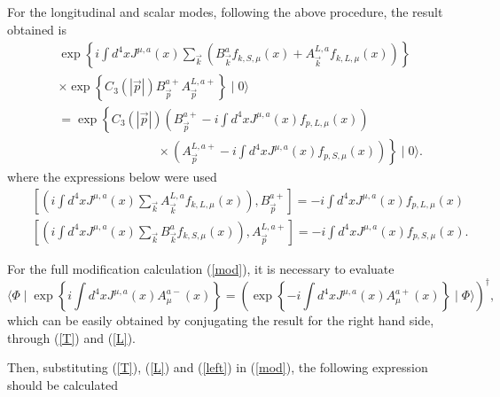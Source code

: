 \documentclass[12pt,letterpaper]{report}
\begin{document}
For the longitudinal and scalar modes, following the above
procedure, the result obtained is
\begin{eqnarray}
&&\exp \left\{i\int d^4xJ^{\mu,a}\left(x\right)
\sum\limits_{\vec{k} }\left(B_{\vec{k}}^af_{k,S,\mu }\left(
x\right) +A_{\vec{k} }^{L,a}f_{k,L,\mu }\left(x\right) \right)
\right\}\nonumber \\ && \times \exp \left\{ C_3\left(\left|
\vec{p}\right| \right) B_{\vec{p}}^{a+}A_{\vec{p}}^{L,a+}\right\}
\mid 0\rangle \nonumber
\\ &&=\exp \left\{ C_3\left(\left| \vec{p}\right| \right) \left(
B_{\vec{p} }^{a+}-i\int d^4xJ^{\mu,a}\left(x\right) f_{p,L,\mu
}\left(x\right) \right) \right. \nonumber
\\&& \qquad\qquad\qquad\qquad \times \left.
\left(A_{\vec{p}}^{L,a+} -i\int d^4xJ^{\mu,a}\left(x\right)
f_{p,S,\mu }\left(x\right) \right) \right\} \mid
0\rangle.\label{L}
\end{eqnarray}
where the expressions below were used
\begin{eqnarray*}
&&\left[ \left(i\int d^4xJ^{\mu,a}\left(x\right)
\sum\limits_{\vec{k} } A_{\vec{k} }^{L,a}f_{k,L,\mu }\left(
x\right) \right),B_{\vec{p}}^{a+}\right] =-i\int
d^4xJ^{\mu,a}\left(x\right) f_{p,L,\mu }\left(x\right) \\ &&\left[
\left(i\int d^4xJ^{\mu,a}\left(x\right) \sum\limits_{\vec{k} }
B_{\vec{k}}^af_{k,S,\mu }\left(x\right) \right),A_{\vec{p}
}^{L,a+}\right] =-i\int d^4xJ^{\mu,a}\left(x\right) f_{p,S,\mu
}\left(x\right).
\end{eqnarray*}

For the full modification calculation (\ref{mod}), it is necessary
to evaluate
\begin{equation}
\langle \Phi \mid \exp \left\{ i\int d^4xJ^{\mu,a}\left(x\right)
A_\mu ^{a-}\left(x\right) \right\} =\left(\exp \left\{ -i\int
d^4xJ^{\mu,a}\left(x\right) A_\mu ^{a+}\left(x\right) \right\}
\mid \Phi \rangle \right) ^{\dagger }, \label{left}
\end{equation}
which can be easily obtained by conjugating the result for the
right hand side, through (\ref{T}) and (\ref{L}).

Then, substituting (\ref{T}), (\ref{L}) and (\ref{left}) in
(\ref{mod}), the following expression should be calculated
\end{document}
